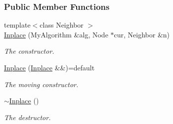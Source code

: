\subsubsection*{Public Member Functions}
\begin{DoxyCompactItemize}
\item 
{\footnotesize template$<$class Neighbor $>$ }\\\hyperlink{structslb_1_1ext_1_1policy_1_1backtrackLock_1_1Inplace_3_01MyAlgorithm_00_01true_01_4_ae13e86e5932f686d7b306dc286be833d}{Inplace} (My\+Algorithm \&alg, Node $\ast$cur, Neighbor \&n)
\begin{DoxyCompactList}\small\item\em The constructor. \end{DoxyCompactList}\item 
\hyperlink{structslb_1_1ext_1_1policy_1_1backtrackLock_1_1Inplace_3_01MyAlgorithm_00_01true_01_4_acf1e0f412c740f8c5d5936361d2f0e6f}{Inplace} (\hyperlink{structslb_1_1ext_1_1policy_1_1backtrackLock_1_1Inplace}{Inplace} \&\&)=default\hypertarget{structslb_1_1ext_1_1policy_1_1backtrackLock_1_1Inplace_3_01MyAlgorithm_00_01true_01_4_acf1e0f412c740f8c5d5936361d2f0e6f}{}\label{structslb_1_1ext_1_1policy_1_1backtrackLock_1_1Inplace_3_01MyAlgorithm_00_01true_01_4_acf1e0f412c740f8c5d5936361d2f0e6f}

\begin{DoxyCompactList}\small\item\em The moving constructor. \end{DoxyCompactList}\item 
\hyperlink{structslb_1_1ext_1_1policy_1_1backtrackLock_1_1Inplace_3_01MyAlgorithm_00_01true_01_4_a0ccbddccfba4038e9b87e2712f76cda9}{$\sim$\+Inplace} ()\hypertarget{structslb_1_1ext_1_1policy_1_1backtrackLock_1_1Inplace_3_01MyAlgorithm_00_01true_01_4_a0ccbddccfba4038e9b87e2712f76cda9}{}\label{structslb_1_1ext_1_1policy_1_1backtrackLock_1_1Inplace_3_01MyAlgorithm_00_01true_01_4_a0ccbddccfba4038e9b87e2712f76cda9}

\begin{DoxyCompactList}\small\item\em The destructor. \end{DoxyCompactList}\end{DoxyCompactItemize}
